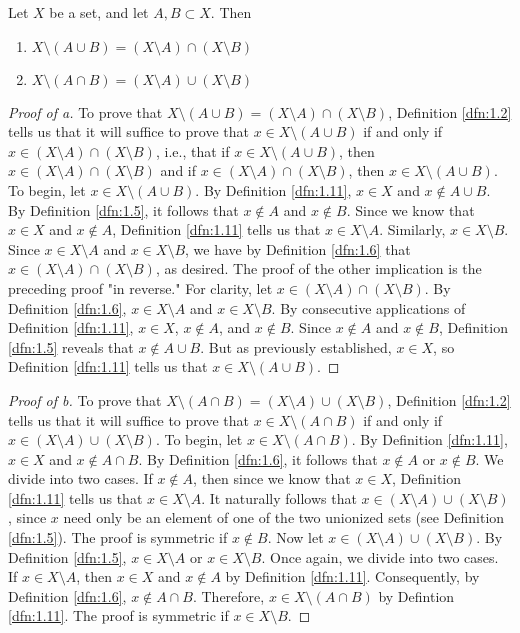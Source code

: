 \documentclass[../main.tex]{subfiles}
\begin{document}
\begin{theorem}\label{trm:1.12}
    Let $X$ be a set, and let $A,B\subset X$. Then
    \begin{enumerate}[label={\alph*\textup{)}}]
        \item $X\setminus(A\cup B)=(X\setminus A)\cap(X\setminus B)$
        \item $X\setminus(A\cap B)=(X\setminus A)\cup(X\setminus B)$
    \end{enumerate}
    \begin{proof}[Proof of a]
        To prove that $X\setminus(A\cup B)=(X\setminus A)\cap(X\setminus B)$, Definition \ref{dfn:1.2} tells us that it will suffice to prove that $x\in X\setminus(A\cup B)$ if and only if $x\in (X\setminus A)\cap(X\setminus B)$, i.e., that if $x\in X\setminus(A\cup B)$, then $x\in (X\setminus A)\cap(X\setminus B)$ and if $x\in (X\setminus A)\cap(X\setminus B)$, then $x\in X\setminus(A\cup B)$. To begin, let $x\in X\setminus(A\cup B)$. By Definition \ref{dfn:1.11}, $x\in X$ and $x\notin A\cup B$. By Definition \ref{dfn:1.5}, it follows that $x\notin A$ and $x\notin B$. Since we know that $x\in X$ and $x\notin A$, Definition \ref{dfn:1.11} tells us that $x\in X\setminus A$. Similarly, $x\in X\setminus B$. Since $x\in X\setminus A$ and $x\in X\setminus B$, we have by Definition \ref{dfn:1.6} that $x\in(X\setminus A)\cap(X\setminus B)$, as desired. The proof of the other implication is the preceding proof "in reverse." For clarity, let $x\in(X\setminus A)\cap(X\setminus B)$. By Definition \ref{dfn:1.6}, $x\in X\setminus A$ and $x\in X\setminus B$. By consecutive applications of Definition \ref{dfn:1.11}, $x\in X$, $x\notin A$, and $x\notin B$. Since $x\notin A$ and $x\notin B$, Definition \ref{dfn:1.5} reveals that $x\notin A\cup B$. But as previously established, $x\in X$, so Definition \ref{dfn:1.11} tells us that $x\in X\setminus(A\cup B)$.
    \end{proof}
    \begin{proof}[Proof of b]
        To prove that $X\setminus(A\cap B)=(X\setminus A)\cup(X\setminus B)$, Definition \ref{dfn:1.2} tells us that it will suffice to prove that $x\in X\setminus(A\cap B)$ if and only if $x\in (X\setminus A)\cup(X\setminus B)$. To begin, let $x\in X\setminus(A\cap B)$. By Definition \ref{dfn:1.11}, $x\in X$ and $x\notin A\cap B$. By Definition \ref{dfn:1.6}, it follows that $x\notin A$ or $x\notin B$. We divide into two cases. If $x\notin A$, then since we know that $x\in X$, Definition \ref{dfn:1.11} tells us that $x\in X\setminus A$. It naturally follows that $x\in(X\setminus A)\cup(X\setminus B)$, since $x$ need only be an element of one of the two unionized sets (see Definition \ref{dfn:1.5}). The proof is symmetric if $x\notin B$. Now let $x\in(X\setminus A)\cup(X\setminus B)$. By Definition \ref{dfn:1.5}, $x\in X\setminus A$ or $x\in X\setminus B$. Once again, we divide into two cases. If $x\in X\setminus A$, then $x\in X$ and $x\notin A$ by Definition \ref{dfn:1.11}. Consequently, by Definition \ref{dfn:1.6}, $x\notin A\cap B$. Therefore, $x\in X\setminus(A\cap B)$ by Defintion \ref{dfn:1.11}. The proof is symmetric if $x\in X\setminus B$.
    \end{proof}
\end{theorem}
\end{document}
